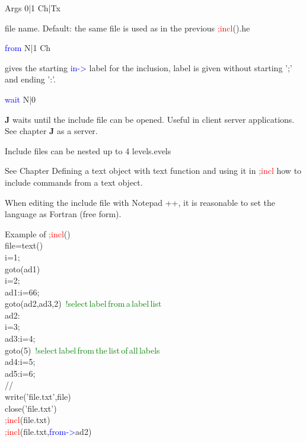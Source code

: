 \vspace{0.3cm}
\hline
\vspace{0.3cm}
\noindent Args  \tabto{3cm}  0|1  \tabto{5cm}   Ch|Tx  \tabto{7cm}
\begin{changemargin}{3cm}{0cm}
\noindent   file name. Default: the same file is used as in the previous \textcolor{Red}{;incl}().he
\end{changemargin}
\vspace{0.3cm}
\hline
\vspace{0.3cm}
\noindent \textcolor{blue}{from}  \tabto{3cm}  N|1  \tabto{5cm}   Ch  \tabto{7cm}
\begin{changemargin}{3cm}{0cm}
\noindent gives the starting \textcolor{blue}{in->} label for the inclusion, label is given without starting ';'
and ending ':'.
\end{changemargin}
\vspace{0.3cm}
\hline
\vspace{0.3cm}
\noindent \textcolor{blue}{wait} \tabto{3cm}  N|0  \tabto{5cm}    \tabto{7cm}
\begin{changemargin}{3cm}{0cm}
\noindent  \textbf{J} waits until the include file can be opened. Useful in client server applications.
See chapter \textbf{J} as a server.
\end {changemargin}
\hline
\vspace{0.2cm}
\begin{note}
Include files can be nested up to 4 levels.evels
\end{note}
\begin{note}
See Chapter Defining a text object with text function and using it in \textcolor{Red}{;incl} how to include
commands from a text object.
\end{note}
\begin{note}
When editing the include file with Notepad ++, it is reasonable to set the language as Fortran (free form).
\end{note}
\begin{example}[inpuincl]Example of \textcolor{Red}{;incl}()\\
\label{inpuincl}
file=\textcolor{VioletRed}{text}()\\
i=1;\\
\textcolor{VioletRed}{goto}(ad1)\\
i=2;\\
ad1:i=66;\\
\textcolor{VioletRed}{goto}(ad2,ad3,2) \,\textcolor{green}{!select\,label\,from\,a\,label\,list}\\
ad2:\\
i=3;\\
ad3:i=4;\\
\textcolor{VioletRed}{goto}(5) \,\textcolor{green}{!select\,label\,from\,the\,list\,of\,all\,labels}\\
ad4:i=5;\\
ad5:i=6;\\
//\\
\textcolor{VioletRed}{write}('file.txt',file)\\
\textcolor{VioletRed}{close}('file.txt')\\
\textcolor{Red}{;incl}(file.txt)\\
\textcolor{Red}{;incl}(file.txt,\textcolor{blue}{from->}ad2)
\end{example}
